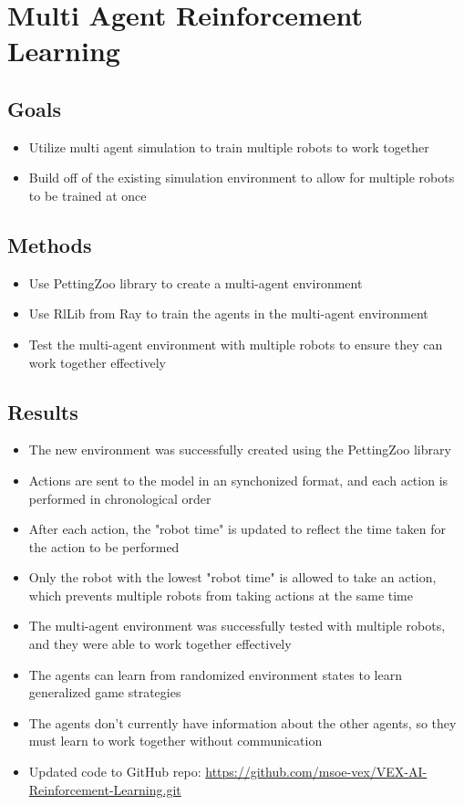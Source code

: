 \section{Multi Agent Reinforcement Learning}

\subsection{Goals}
\begin{itemize}
    \item Utilize multi agent simulation to train multiple robots to work together
    \item Build off of the existing simulation environment to allow for multiple robots to be trained at once
\end{itemize}

\subsection{Methods}
\begin{itemize}
    \item Use PettingZoo library to create a multi-agent environment
    \item Use RlLib from Ray to train the agents in the multi-agent environment
    \item Test the multi-agent environment with multiple robots to ensure they can work together effectively
\end{itemize}

\subsection{Results}
\begin{itemize}
    \item The new environment was successfully created using the PettingZoo library
    \item Actions are sent to the model in an synchonized format, and each action is performed in chronological order
    \item After each action, the "robot time" is updated to reflect the time taken for the action to be performed
    \item Only the robot with the lowest "robot time" is allowed to take an action, which prevents multiple robots from taking actions at the same time
    \item The multi-agent environment was successfully tested with multiple robots, and they were able to work together effectively
    \item The agents can learn from randomized environment states to learn generalized game strategies
    \item The agents don't currently have information about the other agents, so they must learn to work together without communication
    \item Updated code to GitHub repo: \href{https://github.com/msoe-vex/VEX-AI-Reinforcement-Learning.git}{https://github.com/msoe-vex/VEX-AI-Reinforcement-Learning.git}
\end{itemize}

